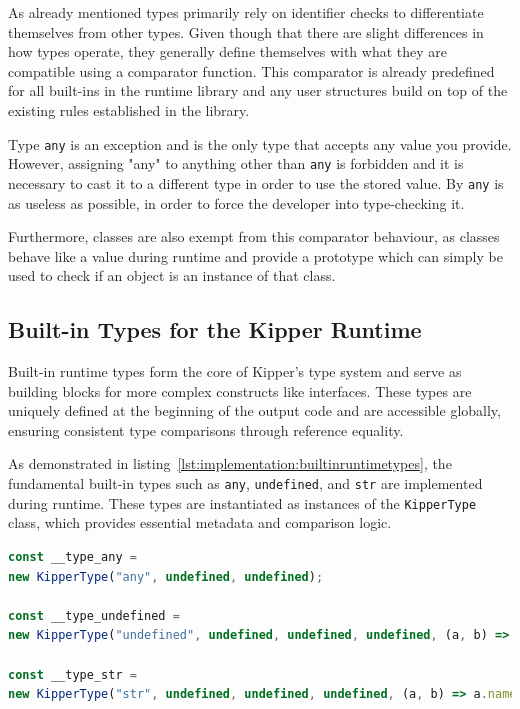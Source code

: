 As already mentioned types primarily rely on identifier checks to differentiate themselves from other types. Given though that there are slight differences in how types operate, they generally define themselves with what they are compatible using a comparator function. This comparator is already predefined for all built-ins in the runtime library and any user structures build on top of the existing rules established in the library.

Type \lstinline|any| is an exception and is the only type that accepts any value you provide. However, assigning "any" to anything other than \lstinline|any| is forbidden and it is necessary to cast it to a different type in order to use the stored value. By  \lstinline|any| is as useless as possible, in order to force the developer into type-checking it.

Furthermore, classes are also exempt from this comparator behaviour, as classes behave like a value during runtime and provide a prototype which can simply be used to check if an object is an instance of that class.

\subsection{Built-in Types for the Kipper Runtime}
\label{sec:builtintypes}

Built-in runtime types form the core of Kipper’s type system and serve as building blocks for more complex constructs like interfaces. These types are uniquely defined at the beginning of the output code and are accessible globally, ensuring consistent type comparisons through reference equality.

As demonstrated in listing~\ref{lst:implementation:builtinruntimetypes}, the fundamental built-in types such as \lstinline|any|, \lstinline|undefined|, and \lstinline|str| are implemented during runtime. These types are instantiated as instances of the \lstinline|KipperType| class, which provides essential metadata and comparison logic.

\begin{lstlisting}[language=TypeScript,caption=Examples for the built-in runtime types,label=lst:implementation:builtinruntimetypes]
const __type_any =
new KipperType("any", undefined, undefined);

const __type_undefined =
new KipperType("undefined", undefined, undefined, undefined, (a, b) => a.name === b.name);

const __type_str =
new KipperType("str", undefined, undefined, undefined, (a, b) => a.name === b.name);
\end{lstlisting}

